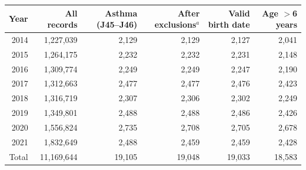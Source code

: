\begin{tabular}{rrrrrr}
\toprule
Year & All records & Asthma (J45--J46) & After exclusions$^{a}$ & Valid birth date & Age $>$6 years \\
\midrule
2014 & 1,227,039 & 2,129 & 2,129 & 2,127 & 2,041 \\
2015 & 1,264,175 & 2,232 & 2,232 & 2,231 & 2,148 \\
2016 & 1,309,774 & 2,249 & 2,249 & 2,247 & 2,190 \\
2017 & 1,312,663 & 2,477 & 2,477 & 2,476 & 2,423 \\
2018 & 1,316,719 & 2,307 & 2,306 & 2,302 & 2,249 \\
2019 & 1,349,801 & 2,488 & 2,488 & 2,486 & 2,426 \\
2020 & 1,556,824 & 2,735 & 2,708 & 2,705 & 2,678 \\
2021 & 1,832,649 & 2,488 & 2,459 & 2,459 & 2,428 \\
\midrule
Total & 11,169,644 & 19,105 & 19,048 & 19,033 & 18,583 \\
\bottomrule
\end{tabular}
